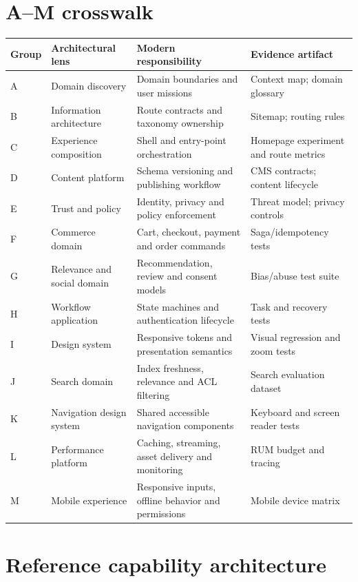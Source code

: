 \documentclass[11pt]{article}
\begin{document}
\section{A--M crosswalk}
\begin{longtable}{@{}>{\raggedright\arraybackslash}p{15mm}>{\raggedright\arraybackslash}p{29mm}>{\raggedright\arraybackslash}p{54mm}>{\raggedright\arraybackslash}p{44mm}@{}}\toprule\textbf{Group}&\textbf{Architectural lens}&\textbf{Modern responsibility}&\textbf{Evidence artifact}\\\midrule\endhead
A & Domain discovery & Domain boundaries and user missions & Context map; domain glossary\\
B & Information architecture & Route contracts and taxonomy ownership & Sitemap; routing rules\\
C & Experience composition & Shell and entry-point orchestration & Homepage experiment and route metrics\\
D & Content platform & Schema versioning and publishing workflow & CMS contracts; content lifecycle\\
E & Trust and policy & Identity, privacy and policy enforcement & Threat model; privacy controls\\
F & Commerce domain & Cart, checkout, payment and order commands & Saga/idempotency tests\\
G & Relevance and social domain & Recommendation, review and consent models & Bias/abuse test suite\\
H & Workflow application & State machines and authentication lifecycle & Task and recovery tests\\
I & Design system & Responsive tokens and presentation semantics & Visual regression and zoom tests\\
J & Search domain & Index freshness, relevance and ACL filtering & Search evaluation dataset\\
K & Navigation design system & Shared accessible navigation components & Keyboard and screen reader tests\\
L & Performance platform & Caching, streaming, asset delivery and monitoring & RUM budget and tracing\\
M & Mobile experience & Responsive inputs, offline behavior and permissions & Mobile device matrix\\
\bottomrule\end{longtable}
\section{Reference capability architecture}
\end{document}
